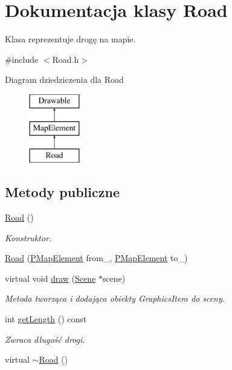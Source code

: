 \hypertarget{class_road}{\section{Dokumentacja klasy Road}
\label{class_road}
}


Klasa reprezentuje drogę na mapie.  




{\ttfamily \#include $<$Road.\-h$>$}

Diagram dziedziczenia dla Road\begin{figure}[H]
\begin{center}
\leavevmode
\includegraphics[height=3.000000cm]{class_road}
\end{center}
\end{figure}
\subsection*{Metody publiczne}
\begin{DoxyCompactItemize}
\item 
\hyperlink{class_road_a90bb6be2a5c3b6997849a915e2af0cf0}{Road} ()
\begin{DoxyCompactList}\small\item\em Konstruktor. \end{DoxyCompactList}\item 
\hyperlink{class_road_a65e61485d6940225dbdb9f6def8e6aa4}{Road} (\hyperlink{_types_8h_a4260a5280323637f8a1fa28e89b6ef14}{P\-Map\-Element} from\-\_\-, \hyperlink{_types_8h_a4260a5280323637f8a1fa28e89b6ef14}{P\-Map\-Element} to\-\_\-)
\item 
virtual void \hyperlink{class_road_a276332c2d6a617ca0fc665470fc49901}{draw} (\hyperlink{class_scene}{Scene} $\ast$scene)
\begin{DoxyCompactList}\small\item\em Metoda tworząca i dodająca obiekty Graphics\-Item do sceny. \end{DoxyCompactList}\item 
int \hyperlink{class_road_ac28b45b44c84944d22aa737fc53a45af}{get\-Length} () const 
\begin{DoxyCompactList}\small\item\em Zwraca długość drogi. \end{DoxyCompactList}\item 
virtual \hyperlink{class_road_ab32a196528ec20e7665a0c402a241b4e}{$\sim$\-Road} ()
\end{DoxyCompactItemize}
